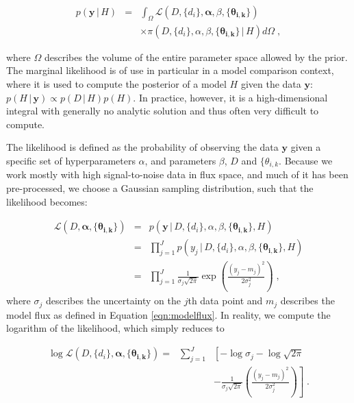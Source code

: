 \documentclass[12pt]{emulateapj}
\newcommand{\given}{\,|\,}
\newcommand{\counts}{y}
\newcommand{\pars}{\theta}
\newcommand{\mean}{m}
\newcommand{\likelihood}{{\mathcal L}}
\begin{document}
\begin{eqnarray}
p(\bm{\counts} \given H) & = & \int_\Omega{ \likelihood(D, \{d_i\}, \bm{\alpha}, \beta, \{\bm{\pars_{i,k}}\}) } \\\nonumber
					& &{ \times \pi(D, \{d_i\}, \alpha, \beta, \{\bm{\pars_{i,k}}\} \given H) d\Omega} \; ,
\end{eqnarray}

\noindent where $\Omega$ describes the volume of the entire parameter space allowed by the prior. The marginal likelihood is of use in particular in a model comparison context, where it is used to compute the posterior of a model $H$ given the data $\bm{\counts}$: $p(H \given \bm{\counts}) \propto p(D \given H) p(H)$. In practice, however, it is a high-dimensional integral with generally no analytic solution and thus often very difficult to compute.

The likelihood is defined as the probability of observing the data $\bm{\counts}$ given a specific set of hyperparameters $\alpha$, and parameters $\beta$, $D$ and $\{\pars_{i,k}$. Because we work mostly with high signal-to-noise data in flux space, and much of it has been pre-processed, we choose a Gaussian sampling distribution, such that the likelihood becomes:

\begin{eqnarray}
\likelihood(D, \bm{\alpha}, \{\bm{\pars_{i,k}}\}) & = & p(\bm{\counts} \given D, \{d_i\}, \alpha, \beta, \{\bm{\pars_{i,k}}\}, H) \\ \nonumber
			& = & \prod_{j=1}^{J}{p(\counts_j \given D, \{d_i\}, \alpha, \beta, \{\bm{\pars_{i,k}}\}, H)} \\\nonumber
			& = & \prod_{j=1}^{J}{\frac{1}{\sigma_j \sqrt{2\pi}}\exp{\left(\frac{(\counts_j - \mean_j)^2}{2\sigma_j^2} \right)}} \; ,
\end{eqnarray}	
\noindent where $\sigma_j$ describes the uncertainty on the $j$th data point and $\mean_j$ describes the model flux as defined in Equation \ref{eqn:modelflux}. In reality, we compute the logarithm of the likelihood, which simply reduces to

\begin{eqnarray}
\log{\likelihood(D, \{d_i\}, \bm{\alpha}, \{\bm{\pars_{i,k}}\})} = & \sum_{j=1}^{J} & \left[ -\log{\sigma_j} - \log{\sqrt{2\pi}} \right. \\ \nonumber
					 & & \left. -\frac{1}{\sigma_j \sqrt{2\pi}}\left(\frac{(\counts_j - \mean_j)^2}{2\sigma_j^2} \right)\right] \; .
\end{eqnarray}
\end{document}
